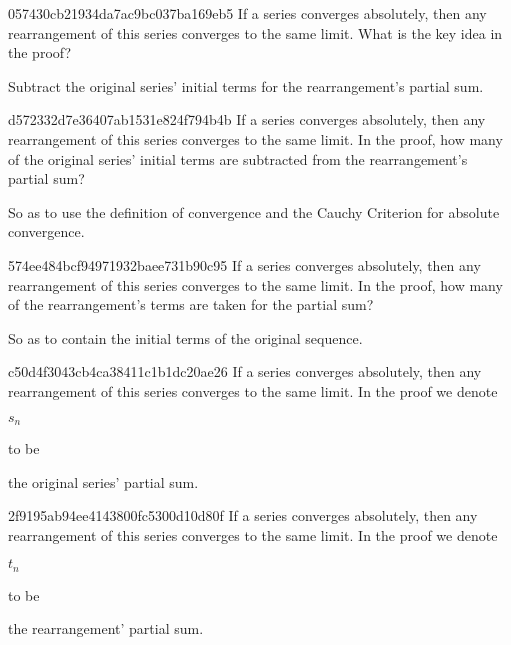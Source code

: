 \begin{note}{057430cb21934da7ac9bc037ba169eb5}
    If a series converges absolutely, then any rearrangement of this series converges to the same limit.
    What is the key idea in the proof?

    \begin{cloze}{1}
        Subtract the original series' initial terms for the re\-ar\-range\-ment's partial sum.
    \end{cloze}
\end{note}

\begin{note}{d572332d7e36407ab1531e824f794b4b}
    If a series converges absolutely, then any rearrangement of this series converges to the same limit.
    In the proof, how many of the original series' initial terms are subtracted from the rearrangement's partial sum?

    \begin{cloze}{1}
        So as to use the definition of convergence and the Cauchy Criterion for absolute convergence.
    \end{cloze}
\end{note}

\begin{note}{574ee484bcf94971932baee731b90c95}
    If a series converges absolutely, then any rearrangement of this series converges to the same limit.
    In the proof, how many of the rearrangement's terms are taken for the partial sum?

    \begin{cloze}{1}
        So as to contain the initial terms of the original sequence.
    \end{cloze}
\end{note}

\begin{note}{c50d4f3043cb4ca38411c1b1dc20ae26}
    If a series converges absolutely, then any rearrangement of this series converges to the same limit.
    In the proof we denote \begin{icloze}{2}\({ s_n }\)\end{icloze} to be \begin{icloze}{1}the original series' partial sum.\end{icloze}
\end{note}

\begin{note}{2f9195ab94ee4143800fc5300d10d80f}
    If a series converges absolutely, then any rearrangement of this series converges to the same limit.
    In the proof we denote \begin{icloze}{2}\({ t_n }\)\end{icloze} to be \begin{icloze}{1}the rearrangement' partial sum.\end{icloze}
\end{note}

